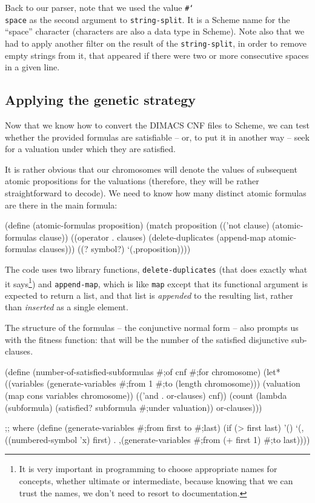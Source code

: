 Back to our parser, note that we used the value
\texttt{\#\char`\\space} as the second argument to 
\texttt{string-split}. It is a Scheme name for the ``space'' character 
(characters are also a data type in Scheme). Note also
that we had to apply another filter on the result of the
\texttt{string-split}, in order to remove empty strings from it,
that appeared if there were two or more
consecutive spaces in a given line.

\subsection{Applying the genetic strategy}

Now that we know how to convert the DIMACS CNF files to Scheme,
we can test whether the provided formulas are satisfiable -- or,
to put it in another way -- seek for a valuation under which
they are satisfied.

It is rather obvious that our chromosomes will denote the
values of subsequent atomic propositions for the valuations
(therefore, they will be rather straightforward to decode).
We need to know how many distinct atomic formulas are there
in the main formula:

\begin{Snippet}
(define (atomic-formulas proposition)
  (match proposition
    (('not clause)
     (atomic-formulas clause))
    ((operator . clauses)
     (delete-duplicates (append-map atomic-formulas clauses)))
    ((? symbol?)
     `(,proposition))))
\end{Snippet}

The code uses two library functions, \texttt{delete-duplicates}
(that does exactly what it says\footnote{
It is very important in programming to choose appropriate
names for concepts, whether ultimate or intermediate, because
knowing that we can trust the names, we don't need to resort
to documentation.
}) and \texttt{append-map}, which
is like \texttt{map} except that its functional argument is
expected to return a list, and that list is \textit{appended}
to the resulting list, rather than \textit{inserted} as
a single element.

The structure of the formulas -- the conjunctive normal
form -- also prompts us with the fitness function: that
will be the number of the satisfied disjunctive sub-clauses.

\begin{Snippet}
(define (number-of-satisfied-subformulas #;of cnf #;for chromosome)
  (let* ((variables (generate-variables #;from 1
                                        #;to (length chromosome)))
         (valuation (map cons variables chromosome))
         (('and . or-clauses) cnf))
    (count (lambda (subformula)
             (satisfied? subformula #;under valuation))
           or-clauses)))
\end{Snippet}
\begin{Snippet}
;; where
(define (generate-variables #;from first to #;last)
  (if (> first last)
    '()
    `(,((numbered-symbol 'x) first) 
      . ,(generate-variables #;from (+ first 1) #;to last))))
\end{Snippet}

